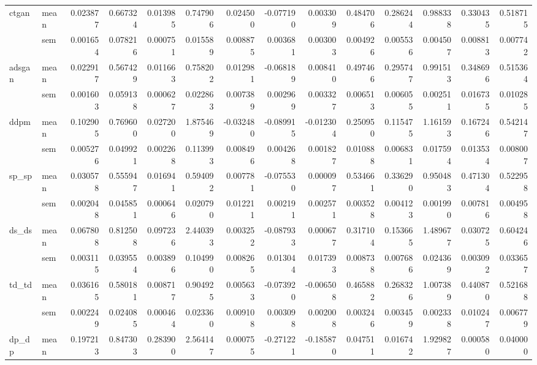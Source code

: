 \begin{tabular}{llrrrrrrrrrrrr}
\cline{1-14}
\multirow[t]{2}{*}{ctgan} & mean & 0.023877 & 0.667324 & 0.013985 & 0.747906 & 0.024500 & -0.077190 & 0.003309 & 0.484706 & 0.286244 & 0.988338 & 0.330435 & 0.518715 \\
 & sem & 0.001654 & 0.078216 & 0.000751 & 0.015589 & 0.008875 & 0.003681 & 0.003003 & 0.004926 & 0.005536 & 0.004507 & 0.008813 & 0.007742 \\
\cline{1-14}
\multirow[t]{2}{*}{adsgan} & mean & 0.022917 & 0.567429 & 0.011663 & 0.758202 & 0.012981 & -0.068189 & 0.008410 & 0.497466 & 0.295747 & 0.991513 & 0.348696 & 0.515364 \\
 & sem & 0.001603 & 0.059138 & 0.000627 & 0.022863 & 0.007389 & 0.002969 & 0.003327 & 0.006513 & 0.006055 & 0.002511 & 0.016735 & 0.010285 \\
\cline{1-14}
\multirow[t]{2}{*}{ddpm} & mean & 0.102905 & 0.769600 & 0.027200 & 1.875469 & -0.032480 & -0.089915 & -0.012304 & 0.250950 & 0.115475 & 1.161593 & 0.167246 & 0.542147 \\
 & sem & 0.005276 & 0.049921 & 0.002268 & 0.113993 & 0.008496 & 0.004268 & 0.001827 & 0.010888 & 0.006831 & 0.017594 & 0.013534 & 0.008007 \\
\cline{1-14}
\multirow[t]{2}{*}{sp_sp} & mean & 0.030578 & 0.555947 & 0.016941 & 0.594092 & 0.007781 & -0.075530 & 0.000097 & 0.534661 & 0.336290 & 0.950483 & 0.471304 & 0.522958 \\
 & sem & 0.002048 & 0.045851 & 0.000646 & 0.020790 & 0.012211 & 0.002191 & 0.002571 & 0.003528 & 0.004123 & 0.001990 & 0.007816 & 0.004958 \\
\cline{1-14}
\multirow[t]{2}{*}{ds_ds} & mean & 0.067808 & 0.812508 & 0.097236 & 2.440393 & 0.003252 & -0.087933 & 0.000677 & 0.317104 & 0.153665 & 1.489677 & 0.030725 & 0.604246 \\
 & sem & 0.003115 & 0.039554 & 0.003896 & 0.104990 & 0.008265 & 0.013044 & 0.017393 & 0.008738 & 0.007686 & 0.024369 & 0.003092 & 0.033657 \\
\cline{1-14}
\multirow[t]{2}{*}{td_td} & mean & 0.036165 & 0.580181 & 0.008717 & 0.904925 & 0.005633 & -0.073920 & -0.006508 & 0.465882 & 0.268326 & 1.007389 & 0.440870 & 0.521688 \\
 & sem & 0.002249 & 0.024085 & 0.000464 & 0.023360 & 0.009108 & 0.003098 & 0.002008 & 0.003246 & 0.003459 & 0.002338 & 0.010247 & 0.006779 \\
\cline{1-14}
\multirow[t]{2}{*}{dp_dp} & mean & 0.197213 & 0.847303 & 0.283900 & 2.564147 & 0.000755 & -0.271221 & -0.185870 & 0.047511 & 0.016742 & 1.929827 & 0.000580 & 0.040000 \\

\end{tabular}
